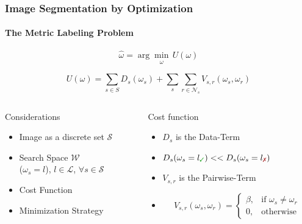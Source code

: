 \begin{frame}\frametitle{Image Segmentation by Optimization}
\framesubtitle{The Metric Labeling Problem}

\vspace{-0.5cm}
\begin{equation*}
\hat{\omega} = \arg \min_{\substack{\omega}} \,U(\omega)
\end{equation*} 

\vspace{-0.2cm}
\begin{equation*}
U(\omega) = \sum_{s\in S} D_s(\omega_s) + \sum_{s}\sum_{r \in \mathcal{N}_{s}} V_{s,r}(\omega_s,\omega_r)
\end{equation*} 

\begin{columns}
\begin{column}{.4\textwidth}
  \begin{block}{Considerations}
    \begin{itemize}
        \item Image as a discrete set $\mathcal{S}$
        \item Search Space $\mathcal{W}$\\
          {\small($\omega_s = l$), $l \in \mathcal{L}$, $\forall s \in \mathcal{S}$}
        \item Cost Function
        \item Minimization Strategy
    \end{itemize}
  \end{block}
\end{column}
\begin{column}{.6\textwidth}
  \begin{block}{Cost function}
    \begin{itemize}
        \item $D_s$ is the Data-Term
        \item $D_s(\omega_s=l_\cmark) << D_s(\omega_s=l_\xmark)$
        \item $V_{s,r}$ is the Pairwise-Term
        \item \[ V_{s,r}(\omega_s,\omega_r) = 
              \begin{cases}
                \beta, & \text{if } \omega_s \ne \omega_r\\
                0,              & \text{otherwise}
              \end{cases} \]
    \end{itemize}
  \end{block}
\end{column}
\end{columns}
\end{frame}

